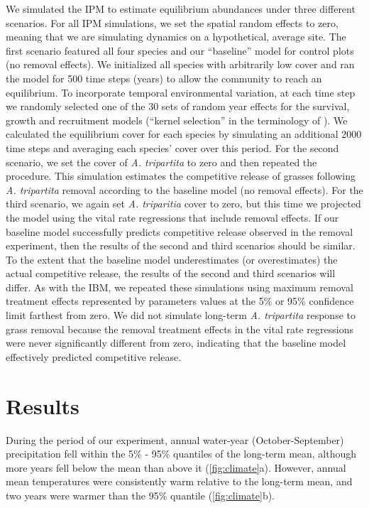 \documentclass[11pt]{article}
\begin{document}
\begin{doublespacing}
We simulated the IPM to estimate equilibrium abundances under three different scenarios. For all IPM simulations, we set the spatial random effects to zero, meaning that we are simulating dynamics on a hypothetical, average site. The first scenario featured all four species and our ``baseline'' model for control plots (no removal effects). We initialized all species with arbitrarily low cover and ran the model for 500 time steps (years) to allow the community to reach an equilibrium. To incorporate temporal environmental variation, at each time step we randomly selected one of the 30 sets of random year effects for the survival, growth and recruitment models (``kernel selection'' in the terminology of \citealt{metcalf_statistical_2015}). We calculated the equilibrium cover for each species by simulating an additional 2000 time steps and averaging each species' cover over this period. For the second scenario, we set the cover of \textit{A. tripartita} to zero and then repeated the procedure. This simulation estimates the competitive release of grasses following \textit{A. tripartita} removal according to the baseline model (no removal effects). For the third scenario, we again set  \textit{A. triparitia} cover to zero, but this time we projected the model using the vital rate regressions that include removal effects. If our baseline model successfully predicts competitive release observed in the removal experiment, then the results of the second and third scenarios should be similar. To the extent that the baseline model underestimates (or overestimates) the actual competitive release, the results of the second and third scenarios will differ. As with the IBM, we repeated these simulations using maximum removal treatment effects represented by parameters values at the 5\% or 95\% confidence limit farthest from zero. We did not simulate long-term \textit{A. tripartita} response to grass removal because the removal treatment effects in the vital rate regressions were never significantly different from zero, indicating that the baseline model effectively predicted competitive release.


\section*{Results}

During the period of our experiment, annual water-year (October-September) precipitation fell within the 5\% - 95\% quantiles of the long-term mean, although more years fell below the mean than above it (\ref{fig:climate}a). However, annual mean temperatures were consistently warm relative to the long-term mean, and two years were warmer than the 95\% quantile (\ref{fig:climate}b).  


\end{doublespacing}
\end{document}
